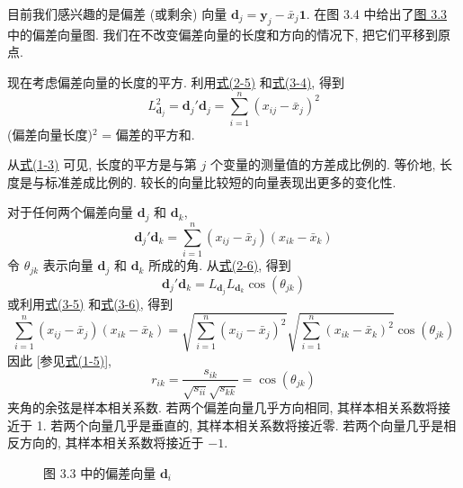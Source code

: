 目前我们感兴趣的是偏差 (或剩余) 向量 $\mathbf{d}_{j}=\mathbf{y}_{j}-\bar{x}_{j}\mathbf{1}$. 在图 3.4 中给出了\hyperref[fig:3.3]{图 3.3} 中的偏差向量图. 我们在不改变偏差向量的长度和方向的情况下, 把它们平移到原点.

现在考虑偏差向量的长度的平方. 利用\hyperref[eq:2-5]{式(2-5)} 和\hyperref[eq:3-4]{式(3-4)}, 得到
\label{eq:3-5}
\begin{equation}
L_{\mathbf{d}_{j}}^{2}=\mathbf{d}_{j}'\mathbf{d}_{j}=\sum_{i=1}^{n}(x_{ij}-\bar{x}_{j})^{2}
\tag{3-5}
\end{equation}
(偏差向量长度)$^{2}$ = 偏差的平方和.

从\hyperref[eq:1-3]{式(1-3)} 可见, 长度的平方是与第 $j$ 个变量的测量值的方差成比例的. 等价地, 长度是与标准差成比例的. 较长的向量比较短的向量表现出更多的变化性.

对于任何两个偏差向量 $\mathbf{d}_{j}$ 和 $\mathbf{d}_{k}$,
\label{eq:3-6}
\begin{equation}
\mathbf{d}_{j}'\mathbf{d}_{k}=\sum_{i=1}^{n}(x_{ij}-\bar{x}_{j})(x_{ik}-\bar{x}_{k})
\tag{3-6}
\end{equation}
令 $\theta_{jk}$ 表示向量 $\mathbf{d}_{j}$ 和 $\mathbf{d}_{k}$ 所成的角. 从\hyperref[eq:2-6]{式(2-6)}, 得到
\[
\mathbf{d}_{j}'\mathbf{d}_{k}=L_{\mathbf{d}_{j}}L_{\mathbf{d}_{k}}\cos(\theta_{jk})
\]
或利用\hyperref[eq:3-5]{式(3-5)} 和\hyperref[eq:3-6]{式(3-6)}, 得到
\[
\sum_{i=1}^{n}(x_{ij}-\bar{x}_{j})(x_{ik}-\bar{x}_{k})=\sqrt{\sum_{i=1}^{n}(x_{ij}-\bar{x}_{j})^{2}}\sqrt{\sum_{i=1}^{n}(x_{ik}-\bar{x}_{k})^{2}}\cos(\theta_{jk})
\]
因此 [参见\hyperref[eq:1-5]{式(1-5)}],
\label{eq:3-7}
\begin{equation}
r_{ik}=\frac{s_{ik}}{\sqrt{s_{ii}}\sqrt{s_{kk}}}=\cos(\theta_{jk})
\tag{3-7}
\end{equation}
夹角的余弦是样本相关系数. 若两个偏差向量几乎方向相同, 其样本相关系数将接近于 1. 若两个向量几乎是垂直的, 其样本相关系数将接近零. 若两个向量几乎是相反方向的, 其样本相关系数将接近于 $-1$.

\begin{figure}[H]
\centering
{}
\caption{图 3.3 中的偏差向量 $\mathbf{d}_{i}$}
\end{figure}

